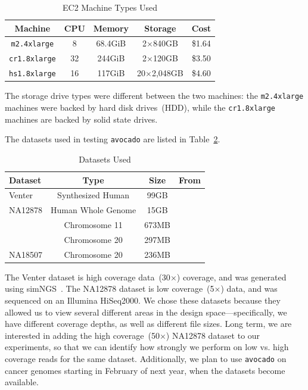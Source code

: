 \documentclass{acm_proc_article-sp}
\begin{document}
\begin{table}[h]
\caption{EC2 Machine Types Used}
\begin{center}
\begin{tabular}{| c || c | c | c | c |}
\hline
\bf Machine & \bf CPU & \bf Memory\footnotemark & \bf Storage & \bf Cost\footnotemark \\
\hline
\hline
\texttt{m2.4xlarge} & 8 & 68.4GiB & 2$\times$840GB & \$1.64 \\
\texttt{cr1.8xlarge} & 32 & 244GiB & 2$\times$120GB & \$3.50 \\
\texttt{hs1.8xlarge} & 16 & 117GiB & 20$\times$2,048GB & \$4.60 \\
\hline 
\end{tabular}
\end{center}
\label{tab:machines}
\end{table}

\addtocounter{footnote}{-1}
\addtocounter{footnote}{1}

The storage drive types were different between the two machines: the \texttt{m2.4xlarge} machines were backed by hard disk drives~(HDD),
while the \texttt{cr1.8xlarge} machines are backed by solid state drives.

The datasets used in testing \texttt{avocado} are listed in Table~\ref{tab:datasets}.

\begin{table}[h]
\caption{Datasets Used}
\begin{center}
\begin{tabular}{| l || c | c | c |}
\hline
\bf Dataset & \bf Type & \bf Size & \bf From \\
\hline
\hline
Venter & Synthesized Human & 99GB & \cite{talwalkar13} \\
\hline
NA12878 & Human Whole Genome & 15GB & \cite{siva08} \\
 & Chromosome 11 & 673MB & \cite{siva08} \\
 & Chromosome 20 & 297MB & \cite{siva08} \\
 \hline
 NA18507 & Chromosome 20 & 236MB & \cite{siva08} \\
\hline
\end{tabular}
\end{center}
\label{tab:datasets}
\end{table}

The Venter dataset is high coverage data~(30$\times$) coverage, and was generated using simNGS~\cite{massingham12}. The NA12878
dataset is low coverage~(5$\times$) data, and was sequenced on an Illumina HiSeq2000. We chose these datasets because they allowed us
to view several different areas in the design space---specifically, we have different coverage depths, as well as different file sizes. Long term,
we are interested in adding the high coverage~(50$\times$) NA12878 dataset to our experiments, so that we can identify how strongly we
perform on low vs. high coverage reads for the same dataset. Additionally, we plan to use \texttt{avocado} on cancer genomes starting in
February of next year, when the datasets become available.
\end{document}
